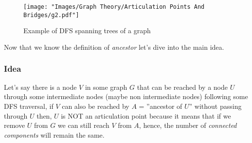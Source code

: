 \begin{figure}[H]
  \centering
  \texttt{[image: "Images/Graph Theory/Articulation Points And Bridges/g2.pdf"]}
  \caption{Example of DFS spanning trees of a graph}
  \label{fig:apb_g2}
\end{figure}


Now that we know the definition of \textit{ancestor} let's dive into the main idea.


\subsubsection*{Idea}

Let's say there is a node $V$ in some graph $G$ that can be reached by a node $U$ through some
intermediate nodes (maybe non intermediate nodes) following some DFS traversal, if $V$ can also be
reached by $A$ = ''ancestor of $U$'' without passing through $U$ then, $U$ is NOT an articulation point
because it means that if we remove $U$ from $G$ we can still reach $V$ from $A$, hence, the number of
\textit{connected components} will remain the same.